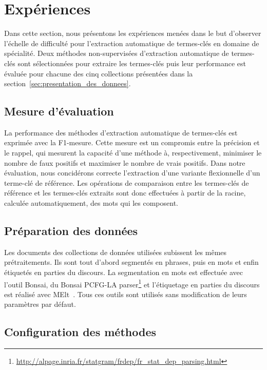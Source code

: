 \section{Expériences}
\label{sec:experiences}
  Dans cette section, nous présentons les expériences menées dans le but
  d'observer l'échelle de difficulté pour l'extraction automatique de
  termes-clés en domaine de spécialité. Deux méthodes non-supervisées
  d'extraction automatique de termes-clés sont sélectionnées pour extraire les
  termes-clés puis leur performance est évaluée pour chacune des cinq
  collections présentées dans la section~\ref{sec:presentation_des_donnees}.

  \subsection{Mesure d'évaluation}
  \label{subsec:mesure_d_evaluation}
    La performance des méthodes d'extraction automatique de termes-clés est
    exprimée avec la F1-mesure. Cette mesure est un compromis entre la précision
    et le rappel, qui mesurent la capacité d'une méthode à, respectivement,
    minimiser le nombre de faux positifs et maximiser le nombre de vrais
    positifs. Dans notre évaluation, nous concidérons correcte l'extraction
    d'une variante flexionnelle d'un terme-clé de référence. Les opérations de
    comparaison entre les termes-clés de référence et les termes-clés extraits
    sont donc effectuées à partir de la racine, calculée automatiquement, des
    mots qui les composent.

  \subsection{Préparation des données}
  \label{subsec:preparation_des_donnees}
    Les documents des collections de données utilisées subissent les mêmes
    prétraitements. Ils sont tout d'abord segmentés en phrases, puis en mots et
    enfin étiquetés en parties du discours. La segmentation en mots est
    effectuée avec l'outil Bonsai, du Bonsai PCFG-LA
    parser\footnote{\url{http://alpage.inria.fr/statgram/frdep/fr_stat_dep_parsing.html}}
    et l'étiquetage en parties du discours est réalisé avec
    MElt~\cite{denis2009melt}. Tous ces outils sont utilisés sans modification
    de leurs paramètres par défaut.

  \subsection{Configuration des méthodes}
  \label{subsec:configuration_des_methodes}

